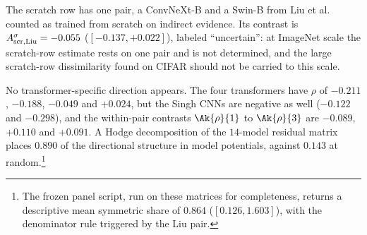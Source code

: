 The scratch row has one pair, a ConvNeXt-B and a Swin-B from Liu et al.~\cite{liu2023comprehensive} counted as trained from scratch on indirect evidence. Its contrast is $A^{\sigma}_{\mathrm{scr,Liu}} = -0.055$ ($[-0.137, +0.022]$), labeled ``uncertain'': at ImageNet scale the scratch-row estimate rests on one pair and is not determined, and the large scratch-row dissimilarity found on CIFAR should not be carried to this scale.

No transformer-specific direction appears. The four transformers have $\rho$ of $-0.211$, $-0.188$, $-0.049$ and $+0.024$, but the Singh CNNs are negative as well ($-0.122$ and $-0.298$), and the within-pair contrasts $\Ak{\rho}{1}$ to $\Ak{\rho}{3}$ are $-0.089$, $+0.110$ and $+0.091$. A Hodge decomposition of the $14$-model residual matrix places $0.890$ of the directional structure in model potentials, against $0.143$ at random.\footnote{The frozen panel script, run on these matrices for completeness, returns a descriptive mean symmetric share of $0.864$ ($[0.126, 1.603]$), with the denominator rule triggered by the Liu pair.}

